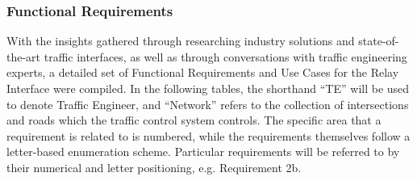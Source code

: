 \documentclass{report}
\begin{document}
\subsubsection{Functional Requirements}
With the insights gathered through researching industry solutions and state-of-the-art traffic interfaces, as well as through conversations with traffic engineering experts, a detailed set of Functional Requirements and Use Cases for the Relay Interface were compiled. 
In the following tables, the shorthand ``TE'' will be used to denote Traffic Engineer, and ``Network'' refers to the collection of intersections and roads which the traffic control system controls.
The specific area that a requirement is related to is numbered, while the requirements themselves follow a letter-based enumeration scheme.
Particular requirements will be referred to by their numerical and letter positioning, e.g. Requirement 2b.
\end{document}
